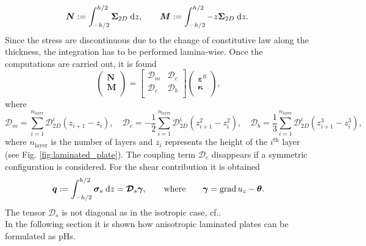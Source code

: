\begin{equation}
	\begin{aligned}
	\bm{N} := \int_{-h/2}^{h/2} \bm{\Sigma}_{2D} \d{z}, \qquad 
	\bm{M} := \int_{-h/2}^{h/2} - z \bm{\Sigma}_{2D} \d{z}. \
	\end{aligned}
\end{equation}
Since the stress are discontinuous due to the change of constitutive law along the thickness, the integration has to be performed lamina-wise. Once the computations are carried out, it is found
\begin{equation}\label{eq:NM_laminated}
\begin{pmatrix}
\bm{N} \\ \bm{M} \\ 
\end{pmatrix} = 
\begin{bmatrix}
\bm{\mathcal{D}}_{m} & \bm{\mathcal{D}}_{c} \\
\bm{\mathcal{D}}_{c} & \bm{\mathcal{D}}_{b} \\
\end{bmatrix}
\begin{pmatrix}
\bm{\varepsilon}^0 \\ \bm{\kappa} \\ 
\end{pmatrix},
\end{equation}
where
\begin{equation}
	\bm{\mathcal{D}}_{m} = \sum_{i = 1}^{n_{\text{layer}}} \bm{\mathcal{D}}_{2D}^i (z_{i+1}-z_{i}), \quad \bm{\mathcal{D}}_{c} = -\frac{1}{2}\sum_{i = 1}^{n_{\text{layer}}} \bm{\mathcal{D}}_{2D}^i (z_{i+1}^2-z_{i}^2), \quad \bm{\mathcal{D}}_{b} = \frac{1}{3} \sum_{i = 1}^{n_{\text{layer}}} \bm{\mathcal{D}}_{2D}^i (z_{i+1}^3-z_{i}^3),
\end{equation}
where $n_{\text{layer}}$ is the number of layers and $z_i$ represents the height of the $i^{\text{th}}$ layer (see Fig. \ref{fig:laminated_plate}). The coupling term $\bm{\mathcal{D}}_{c}$ disappears if a symmetric configuration is considered. For the shear contribution it is obtained
\begin{equation}\label{eq:q_laminated}
	\bm{q} := \int_{-h/2}^{h/2} \bm{\sigma}_{s} \d{z} = \bm{\mathcal{D}}_s \bm{\gamma}, \where \bm{\gamma}= \grad u_z - \bm{\theta}.
\end{equation} 
The tensor $\bm{\mathcal{D}}_s$ is not diagonal as in the isotropic case, cf.. \\

 In the following section it is shown how anisotropic laminated plates can be formulated as pHs.

